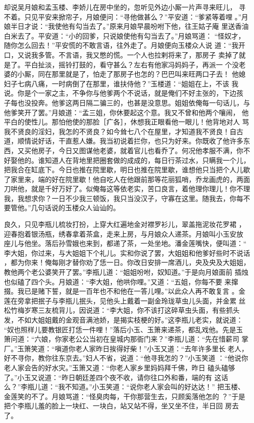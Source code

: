 却说吴月娘和孟玉楼、李娇儿在房中坐的，忽听见外边小厮一片声寻来旺儿，
寻不着。只见平安来掀帘子，月娘便问：“寻他做甚么？”平安道：“爹紧等着哩
。”月娘半日才说：“我使他有勾当去了。”原来月娘早晨吩咐下他，往王姑子庵
里送香油白米去了。平安道：“小的回爹，只说娘使他有勾当去了。”月娘骂道：
“怪奴才，随你怎么回去！”平安慌的不敢言语，往外走了。月娘便向玉楼众人说
道：“我开口，又说我多管。不言语，我又憋的慌。一个人也拉剌将来了，那房子
卖掉了就是了。平白扯淡，摇铃打鼓的，看守甚么？左右有他家冯妈妈子，再派一
个没老婆的小厮，同在那里就是了，怕走了那房子也怎的？巴巴叫来旺两口子去！
他媳妇子七病八痛，一时病倒了在那里，谁扶侍他？”玉楼道：“姐姐在上，不该
我说。你是个一家之主，不争你与他爹两个不说话，就是俺们不好主张的，下边孩
子每也没投奔。他爹这两日隔二骗三的，也甚是没意思。姐姐依俺每一句话儿，与
他爹笑开了罢。”月娘道：“孟三姐，你休要起这个意。我又不曾和他两个嚷闹，
他平白的使性儿。那怕他使的那脸［疒各］，休想我正眼看他一眼儿！他背地对人
骂我不贤良的淫妇，我怎的不贤良？如今耸七八个在屋里，才知道我不贤良！自古
道，顺情说好话，干直惹人嫌。我当初说着拦你，也只为好来。你既收了他许多东
西，又买他房子，今日又图谋他老婆，就着官儿也看乔了。何况他孝服不满，你不
好娶他的。谁知道人在背地里把圈套做的成成的，每日行茶过水，只瞒我一个儿，
把我合在缸底下。今日也推在院里歇，明日也推在院里歇，谁想他只当把个人儿歇
了家里来，端的好在院里歇！他自吃人在他跟前那等花丽狐哨，乔龙画虎的，两面
刀哄他，就是千好万好了。似俺每这等依老实，苦口良言，着他理你理儿！你不理
我，我想求你？一日不少我三顿饭，我只当没汉子，守寡在这里。随我去，你每不
要管他。”几句话说的玉楼众人讪讪的。

良久，只见李瓶儿梳妆打扮，上穿大红遍地金对襟罗衫儿，翠盖拖泥妆花罗裙
，迎春抱着银汤瓶，绣春拿着茶盒，走来上房，与月娘众人递茶。月娘叫小玉安放
座儿与他坐。落后孙雪娥也来到，都递了茶，一处坐地。潘金莲嘴快，便叫道：“
李大姐，你过来，与大姐姐下个礼儿。实和你说了罢，大姐姐和他爹好些时不说话
，都为你来！俺每刚才替你劝了恁一日。你改日安排一席酒儿，央及央及大姐姐，
教他两个老公婆笑开了罢。”李瓶儿道：“姐姐吩咐，奴知道。”于是向月娘面前
插烛也似磕了四个头。月娘道：“李大姐，他哄你哩。”又道：“五姐，你每不要
来撺掇。我已是赌下誓，就是一百年也不和他在一答儿哩。”以此众人再不敢复言
。金莲在旁拿把抿子与李瓶儿抿头，见他头上戴着一副金玲珑草虫儿头面，并金累
丝松竹梅岁寒三友梳背儿，因说道：“李大姐，你不该打这碎草虫头面，有些抓头
发，不如大姐姐戴的金观音满池娇，是揭实枝梗的好。”这李瓶儿老实，就说道：
“奴也照样儿要教银匠打恁一件哩！”落后小玉、玉箫来递茶，都乱戏他。先是玉
箫问道：“六娘，你家老公公当初在皇城内那衙门来？”李瓶儿道：“先在惜薪司
掌厂。”玉箫笑道：“嗔道你老人家昨日挨得好柴！”小玉又道：“去年许多里长
老人，好不寻你，教你往东京去。”妇人不省，说道：“他寻我怎的？”小玉笑道
：“他说你老人家会告的好水灾。”玉箫又道：“你老人家乡里妈妈拜千佛，昨日
磕头磕够了。”小玉又说道：“昨日朝廷差四个夜不收，请你往口外和番，端的有
这话么？”李瓶儿道：“我不知道。”小玉笑道：“说你老人家会叫的好达达！”
把玉楼、金莲笑的不了。月娘骂道：“怪臭肉每，干你那营生去，只顾奚落他怎的
？”于是把个李瓶儿羞的脸上一块红、一块白，站又站不得，坐又坐不住，半日回
房去了。

